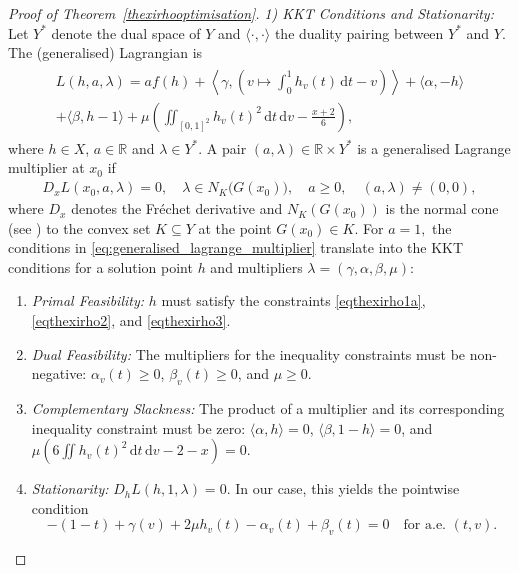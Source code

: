 \documentclass{article}
\theoremstyle{plain}
\theoremstyle{definition}
\newcommand{\de}{\mathrm{\,d}}
\begin{document}
\begin{proof}[Proof of Theorem~\ref{thexirhooptimisation}]
\emph{1) KKT Conditions and Stationarity:}
Let $Y^*$ denote the dual space of \(Y\) and $\langle\cdot,\cdot\rangle$ the duality pairing between \(Y^*\) and \(Y\).
The (generalised) Lagrangian is
\begin{align}\label{eq:generalised_lagrangian}
\begin{split}
    L(h, a, \lambda) = a f(h) + \left\langle \gamma, \left(v \mapsto \int_0^1 h_v(t)\de t - v\right) \right\rangle + \langle \alpha, -h \rangle \\
    + \langle \beta, h-1 \rangle + \mu \left( \iint_{[0,1]^2} h_v(t)^2\de t\de v - \frac{x+2}{6} \right),
    \end{split}
\end{align}
where $h\in X$, \(a\in\mathbb{R}\) and $\lambda\in Y^*$.
A pair \((a,\lambda)\in\mathbb{R}\times Y^{*}\) is a generalised Lagrange multiplier at \(x_0\) if
\begin{align}\label{eq:generalised_lagrange_multiplier}
  D_xL(x_0,a,\lambda) = 0,
  \quad
  \lambda\in N_{K}\!\bigl(G(x_0)\bigr),
  \quad
  a\ge 0,
  \quad
  (a,\lambda)\neq(0,0),
\end{align}
where \(D_x\) denotes the Fr{\'e}chet derivative and $N_K(G(x_0))$ is the normal cone (see \cite[Equation (2.97) and (2.98)]{bonnans2013perturbation})
to the convex set $K \subseteq Y$ at the point $G(x_0) \in K.$
For \(a=1,\) the conditions in \eqref{eq:generalised_lagrange_multiplier} translate into the KKT conditions for a solution point $h$ and multipliers $\lambda=(\gamma, \alpha, \beta, \mu)$:
\begin{enumerate}[label=(\roman*), font=\upshape]
    \item \emph{Primal Feasibility:} $h$ must satisfy the constraints \eqref{eqthexirho1a}, \eqref{eqthexirho2}, and \eqref{eqthexirho3}.
    \item \emph{Dual Feasibility:} The multipliers for the inequality constraints must be non-negative: $\alpha_v(t) \ge 0$, $\beta_v(t) \ge 0$, and $\mu \ge 0$.
    \item \emph{Complementary Slackness:} The product of a multiplier and its corresponding inequality constraint must be zero: $\langle \alpha, h \rangle = 0$, $\langle \beta, 1-h \rangle = 0$, and $\mu \left( 6\iint h_v(t)^2\de t\de v - 2 - x \right)=0$.
    \item \emph{Stationarity:} $D_h L(h,1,\lambda)=0$. In our case, this yields the pointwise condition
    \[
    -(1-t) + \gamma(v) + 2\mu h_v(t) - \alpha_v(t) + \beta_v(t) = 0 \quad \text{for a.e. } (t,v).
    \]
\end{enumerate}


\end{proof}
\end{document}
